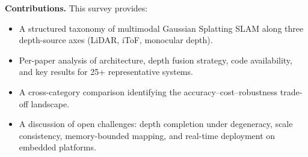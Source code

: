 \textbf{Contributions.}  This survey provides:
\begin{itemize}
    \item A structured taxonomy of multimodal Gaussian Splatting SLAM along
    three depth-source axes (LiDAR, iToF, monocular depth).
    \item Per-paper analysis of architecture, depth fusion strategy, code
    availability, and key results for 25+ representative systems.
    \item A cross-category comparison identifying the accuracy--cost--robustness
    trade-off landscape.
    \item A discussion of open challenges: depth completion under degeneracy,
    scale consistency, memory-bounded mapping, and real-time deployment on
    embedded platforms.
\end{itemize}
